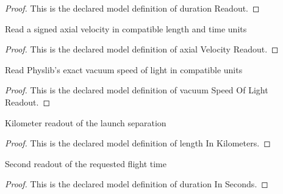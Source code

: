 \begin{proof}
  This is the declared model definition of duration Readout.
\end{proof}
\begin{definition}
  \label{def:physics:phyx-mini-0512:phyxminiproblems-problemphyxmini0512-axialvelocityreadout}
  Read a signed axial velocity in compatible length and time units
\end{definition}
\begin{proof}
  This is the declared model definition of axial Velocity Readout.
\end{proof}
\begin{definition}
  \label{def:physics:phyx-mini-0512:phyxminiproblems-problemphyxmini0512-vacuumspeedoflightreadout}
  Read Physlib's exact vacuum speed of light in compatible units
\end{definition}
\begin{proof}
  This is the declared model definition of vacuum Speed Of Light Readout.
\end{proof}
\begin{definition}
  \label{def:physics:phyx-mini-0512:phyxminiproblems-problemphyxmini0512-lengthinkilometers}
  Kilometer readout of the launch separation
\end{definition}
\begin{proof}
  This is the declared model definition of length In Kilometers.
\end{proof}
\begin{definition}
  \label{def:physics:phyx-mini-0512:phyxminiproblems-problemphyxmini0512-durationinseconds}
  Second readout of the requested flight time
\end{definition}
\begin{proof}
  This is the declared model definition of duration In Seconds.
\end{proof}
